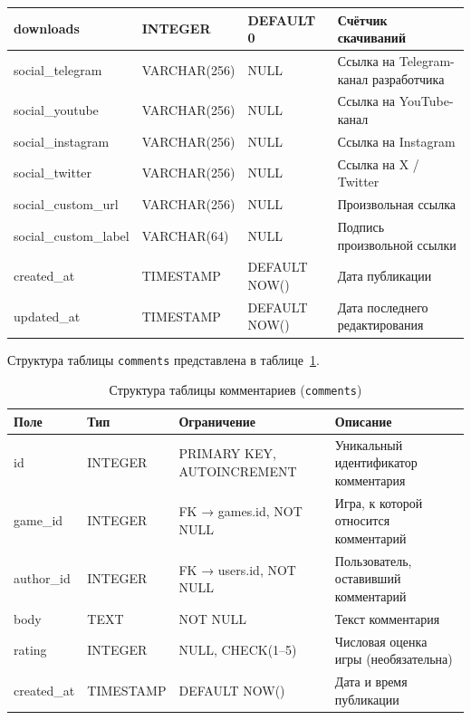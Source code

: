 \begin{longtable}{|l|l|p{3.5cm}|p{5.5cm}|}
    downloads        & INTEGER      & DEFAULT 0                   & Счётчик скачиваний \\ \hline
    social\_telegram & VARCHAR(256) & NULL                        & Ссылка на Telegram-канал разработчика \\ \hline
    social\_youtube  & VARCHAR(256) & NULL                        & Ссылка на YouTube-канал \\ \hline
    social\_instagram & VARCHAR(256)& NULL                        & Ссылка на Instagram \\ \hline
    social\_twitter  & VARCHAR(256) & NULL                        & Ссылка на X / Twitter \\ \hline
    social\_custom\_url & VARCHAR(256) & NULL                     & Произвольная ссылка \\ \hline
    social\_custom\_label & VARCHAR(64) & NULL                    & Подпись произвольной ссылки \\ \hline
    created\_at      & TIMESTAMP    & DEFAULT NOW()               & Дата публикации \\ \hline
    updated\_at      & TIMESTAMP    & DEFAULT NOW()               & Дата последнего редактирования \\ \hline
\end{longtable}

Структура таблицы \texttt{comments} представлена в таблице~\ref{tab:db_comments}.

\begin{table}[ht!]
    \centering
    \caption{Структура таблицы комментариев (\texttt{comments})}
    \label{tab:db_comments}
    \small
    \begin{tabularx}{\textwidth}{|l|l|p{3.5cm}|X|}
        \hline
        \textbf{Поле} & \textbf{Тип} & \textbf{Ограничение} & \textbf{Описание} \\ \hline
        id          & INTEGER   & PRIMARY KEY, AUTOINCREMENT & Уникальный идентификатор комментария \\ \hline
        game\_id    & INTEGER   & FK → games.id, NOT NULL    & Игра, к которой относится комментарий \\ \hline
        author\_id  & INTEGER   & FK → users.id, NOT NULL    & Пользователь, оставивший комментарий \\ \hline
        body        & TEXT      & NOT NULL                   & Текст комментария \\ \hline
        rating      & INTEGER   & NULL, CHECK(1--5)          & Числовая оценка игры (необязательна) \\ \hline
        created\_at & TIMESTAMP & DEFAULT NOW()              & Дата и время публикации \\ \hline
    \end{tabularx}
\end{table}

